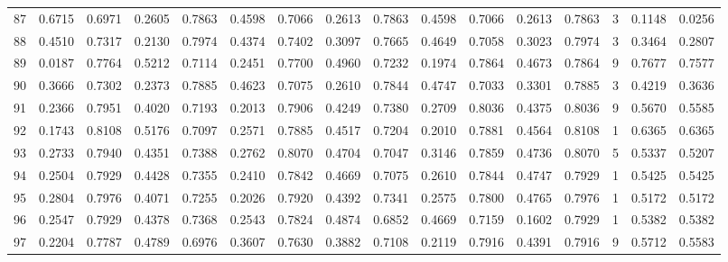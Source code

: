\begin{tabular}{lrrrrrrrrrrrrrrr}
87  &      0.6715 &  0.6971 &  0.2605 &  0.7863 &  0.4598 &  0.7066 &  0.2613 &  0.7863 &  0.4598 &  0.7066 &   0.2613 &     0.7863 &      3 &                    0.1148 &                     0.0256 \\
88  &      0.4510 &  0.7317 &  0.2130 &  0.7974 &  0.4374 &  0.7402 &  0.3097 &  0.7665 &  0.4649 &  0.7058 &   0.3023 &     0.7974 &      3 &                    0.3464 &                     0.2807 \\
89  &      0.0187 &  0.7764 &  0.5212 &  0.7114 &  0.2451 &  0.7700 &  0.4960 &  0.7232 &  0.1974 &  0.7864 &   0.4673 &     0.7864 &      9 &                    0.7677 &                     0.7577 \\
90  &      0.3666 &  0.7302 &  0.2373 &  0.7885 &  0.4623 &  0.7075 &  0.2610 &  0.7844 &  0.4747 &  0.7033 &   0.3301 &     0.7885 &      3 &                    0.4219 &                     0.3636 \\
91  &      0.2366 &  0.7951 &  0.4020 &  0.7193 &  0.2013 &  0.7906 &  0.4249 &  0.7380 &  0.2709 &  0.8036 &   0.4375 &     0.8036 &      9 &                    0.5670 &                     0.5585 \\
92  &      0.1743 &  0.8108 &  0.5176 &  0.7097 &  0.2571 &  0.7885 &  0.4517 &  0.7204 &  0.2010 &  0.7881 &   0.4564 &     0.8108 &      1 &                    0.6365 &                     0.6365 \\
93  &      0.2733 &  0.7940 &  0.4351 &  0.7388 &  0.2762 &  0.8070 &  0.4704 &  0.7047 &  0.3146 &  0.7859 &   0.4736 &     0.8070 &      5 &                    0.5337 &                     0.5207 \\
94  &      0.2504 &  0.7929 &  0.4428 &  0.7355 &  0.2410 &  0.7842 &  0.4669 &  0.7075 &  0.2610 &  0.7844 &   0.4747 &     0.7929 &      1 &                    0.5425 &                     0.5425 \\
95  &      0.2804 &  0.7976 &  0.4071 &  0.7255 &  0.2026 &  0.7920 &  0.4392 &  0.7341 &  0.2575 &  0.7800 &   0.4765 &     0.7976 &      1 &                    0.5172 &                     0.5172 \\
96  &      0.2547 &  0.7929 &  0.4378 &  0.7368 &  0.2543 &  0.7824 &  0.4874 &  0.6852 &  0.4669 &  0.7159 &   0.1602 &     0.7929 &      1 &                    0.5382 &                     0.5382 \\
97  &      0.2204 &  0.7787 &  0.4789 &  0.6976 &  0.3607 &  0.7630 &  0.3882 &  0.7108 &  0.2119 &  0.7916 &   0.4391 &     0.7916 &      9 &                    0.5712 &                     0.5583 \\

\end{tabular}
